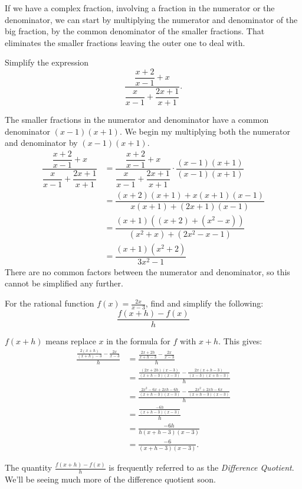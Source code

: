 \documentclass{ximera}
\begin{document}
If we have a complex fraction, involving a fraction in the numerator or the denominator, we can start by multiplying the numerator
and denominator of the big fraction, by the common denominator of the smaller fractions.  That eliminates the smaller fractions leaving
the outer one to deal with.
\begin{example}
	Simplify the expression \[ \dfrac{ \dfrac{x+2}{x-1} + x}{\dfrac{x}{x-1} + \dfrac{2x+1}{x+1}}.\]
	\begin{explanation}
		The smaller fractions in the numerator and denominator have a common denominator $(x-1)(x+1)$.  We begin my multiplying
		both the numerator and denominator by $(x-1)(x+1)$.
		\begin{align*}
			\dfrac{ \dfrac{x+2}{x-1} + x}{\dfrac{x}{x-1} + \dfrac{2x+1}{x+1}} &= \dfrac{ \dfrac{x+2}{x-1} + x}{\dfrac{x}{x-1} + \dfrac{2x+1}{x+1}} \cdot \dfrac{(x-1)(x+1)}{(x-1)(x+1)}\\
				&= \dfrac{(x+2)(x+1) + x(x+1)(x-1)}{x(x+1) + (2x+1)(x-1)}\\
				&= \dfrac{(x+1)\left( (x+2)  + (x^2-x) \right)}{(x^2+x) + (2x^2 - x - 1)}\\
				&= \dfrac{(x+1)\left( x^2 + 2 \right)}{3 x^2 - 1}
		\end{align*}
		There are no common factors between the numerator and denominator, so this cannot be simplified any further.
	\end{explanation}
\end{example}

\begin{example}
	For the rational function $\displaystyle f(x) = \frac{2x}{x-3}$, find and simplify the following:
		\[ \frac{f(x+h)-f(x)}{h} \]
	\begin{explanation}
		$\displaystyle f(x+h)$ means replace $x$ in the formula for $f$ with $x+h$.  This gives:
		\begin{align*}
			\frac{\frac{2(x+h)}{(x+h)-3} - \frac{2x}{x-3} }{h} &= \frac{ \frac{2x+2h}{x+h-3} - \frac{2x}{x-3}}{h} \\
				&= \frac{ \frac{ (2x+2h)(x-3) }{(x+h-3)(x-3)} - \frac{2x(x+h-3)}{(x-3)(x+h-3)} }{h}\\
				&= \frac{ \frac{2x^2-6x+2xh-6h}{(x+h-3)(x-3)} - \frac{2x^2+2xh-6x}{(x+h-3)(x-3)}  }{h}\\
				&= \frac{  \frac{-6h}{(x+h-3)(x-3)}     }{h} \\
				&= \frac{-6h}{h(x+h-3)(x-3)} \\
				&= \frac{-6}{(x+h-3)(x-3)}.
		\end{align*}
	\end{explanation}
\end{example}
The quantity $\frac{f(x+h)-f(x)}{h}$ is frequently referred to as the \emph{Difference Quotient}.  We'll be seeing much more
of the difference quotient soon.
\end{document}
